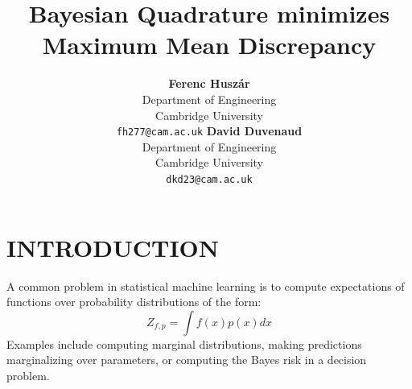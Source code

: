 \documentclass[]{article}
\title{Bayesian Quadrature minimizes Maximum Mean Discrepancy}
\author{ {\bf Ferenc Husz\'{a}r} \\
Department of Engineering\\
Cambridge University\\ 
\texttt{fh277@cam.ac.uk}
\And 
{\bf David Duvenaud } \\ %
Department of Engineering\\ 
Cambridge University \\
\texttt{dkd23@cam.ac.uk}
}
\begin{document}
 
 
\maketitle 
 

 
\section{INTRODUCTION}
A common problem in statistical machine learning is to compute expectations of functions over probability distributions of the form:
\begin{equation}
	Z_{f,p} = \int f(x) p(x) dx \label{eqn:integral}
\end{equation}
Examples include computing marginal distributions, making predictions marginalizing over parameters, or computing the Bayes risk in a decision problem. %


\end{document}
